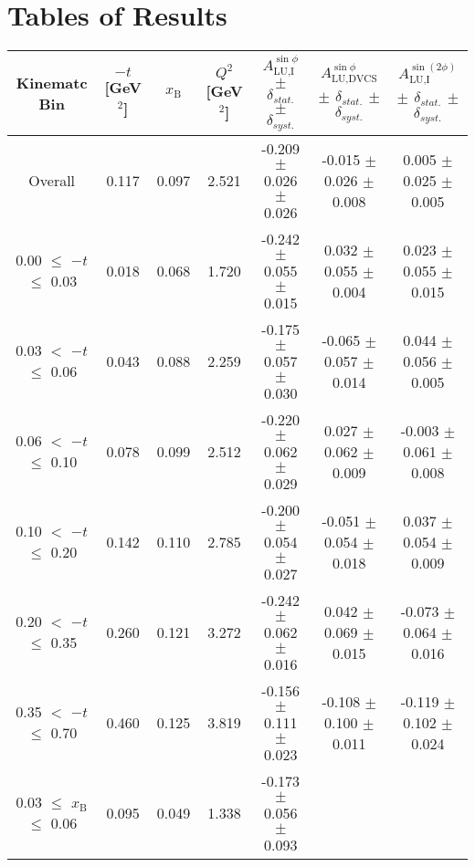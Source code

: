 \appendix
\setcounter{equation}{0}

\section{Tables of Results}


\begin{table}[width=15cm]
 \begin{center}
\resizebox{16cm}{!} {
  \begin{tabular}{|c|c|c|c|c|c|c|}
\hline
Kinematc Bin &  $-t$ [GeV$^{2}$] & $x_{\textrm{B}}$ & $Q^{2}$ [GeV$^{2}$] & 
$A_{\textrm{LU,I}}^{\sin\phi}$ $\pm$ $\delta_{stat.}$ $\pm$ $\delta_{syst.}$ & $A_{\textrm{LU,DVCS}}^{\sin\phi}$ $\pm$ $\delta_{stat.}$ $\pm$ $\delta_{syst.}$
& $A_{\textrm{LU,I}}^{\sin(2\phi)}$ $\pm$ $\delta_{stat.}$ $\pm$ $\delta_{syst.}$ \\
\hline
\hline
Overall &  0.117 & 0.097 &  2.521 &  -0.209  $\pm$  0.026  $\pm$   0.026 &
 -0.015  $\pm$  0.026  $\pm$  0.008 & 0.005  $\pm$  0.025  $\pm$   0.005 \\
\hline
0.00 $\leqslant$ $-t$ $\leqslant$ 0.03 &  0.018 & 0.068 &  1.720 &  -0.242  $\pm$  0.055  $\pm$   0.015 &
 0.032  $\pm$  0.055   $\pm$  0.004 & 0.023  $\pm$  0.055  $\pm$   0.015\\
0.03 $<$ $-t$ $\leqslant$ 0.06 &  0.043 & 0.088 &  2.259&  -0.175 $\pm$   0.057   $\pm$  0.030 &
 -0.065 $\pm$   0.057  $\pm$   0.014 & 0.044  $\pm$  0.056  $\pm$   0.005\\
0.06 $<$ $-t$ $\leqslant$ 0.10 &  0.078 & 0.099 &  2.512 & -0.220 $\pm$   0.062   $\pm$  0.029 &
 0.027  $\pm$  0.062  $\pm$   0.009 & -0.003  $\pm$  0.061   $\pm$  0.008 \\
0.10 $<$ $-t$ $\leqslant$ 0.20 &  0.142 & 0.110 &  2.785 &  -0.200 $\pm$   0.054  $\pm$   0.027 &
-0.051  $\pm$  0.054  $\pm$   0.018 & 0.037  $\pm$  0.054  $\pm$  0.009\\
0.20 $<$ $-t$ $\leqslant$ 0.35 &  0.260 & 0.121 &  3.272 &  -0.242 $\pm$   0.062  $\pm$   0.016 &
0.042  $\pm$  0.069  $\pm$   0.015 & -0.073 $\pm$   0.064   $\pm$  0.016\\
0.35 $<$ $-t$ $\leqslant$ 0.70 &  0.460 & 0.125 &  3.819 &  -0.156  $\pm$  0.111  $\pm$   0.023 & 
-0.108  $\pm$  0.100   $\pm$  0.011 & -0.119 $\pm$   0.102  $\pm$   0.024\\
\hline
0.03 $\leqslant$ $x_{\textrm{B}}$ $\leqslant$ 0.06 &  0.095 & 0.049 &  1.338 &  -0.173  $\pm$  0.056  $\pm$   0.093 &

\end{tabular}}
\end{center}
\end{table}
